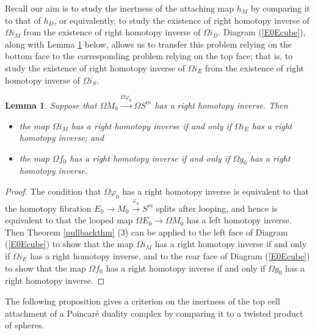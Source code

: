 \documentclass[a4]{amsart}
\newtheorem{lemma}[theorem]{Lemma}
\theoremstyle{definition}
\begin{document}
\begin{sloppypar}
Recall our aim is to study the inertness of the attaching map $h_M$ by comparing it to that of $h_D$, or equivalently, to study the existence of right homotopy inverse of $\Omega i_M$ from the existence of right homotopy inverse of $\Omega i_D$. Diagram (\ref{E0Ecube}), along with Lemma \ref{loopphilemma} below, allows us to transfer this problem relying on the bottom face to the corresponding problem relying on the top face; that is, to study the existence of right homotopy inverse of $\Omega i_E$ from the existence of right homotopy inverse of $\Omega i_S$.

\begin{lemma}\label{loopphilemma}
Suppose that $\Omega M_0\stackrel{\Omega \varphi_0}{\longrightarrow} \Omega S^m$ has a right homotopy inverse. Then 
\begin{itemize}
\item[(1).] the map $\Omega i_M$ has a right homotopy inverse if and only if $\Omega i_E$  has a right homotopy inverse; and
\item[(2).] the map $\Omega f_0$ has a right homotopy inverse if and only if $\Omega g_0$  has a right homotopy inverse.
\end{itemize}
\end{lemma}
\begin{proof}
The condition that $\Omega \varphi_0$ has a right homotopy inverse is equivalent to that the homotopy fibration $E_0\stackrel{}{\longrightarrow}M_0\stackrel{\varphi_0}{\longrightarrow} S^m$ splits after looping, and hence is equivalent to that the looped map $\Omega E_0\longrightarrow \Omega M_0$ has a left homotopy inverse. Then Theorem \ref{pullbackthm} (3) can be applied to the left face of Diagram (\ref{E0Ecube}) to show that the map $\Omega i_M$ has a right homotopy inverse if and only if $\Omega i_E$  has a right homotopy inverse, and to the rear face of Diagram (\ref{E0Ecube}) to show that the map $\Omega f_0$ has a right homotopy inverse if and only if $\Omega g_0$  has a right homotopy inverse.
\end{proof}

The following proposition gives a criterion on the inertness of the top cell attachment of a Poincar\'{e} duality complex by comparing it to a twisted product of spheres. 


\end{sloppypar}
\end{document}
